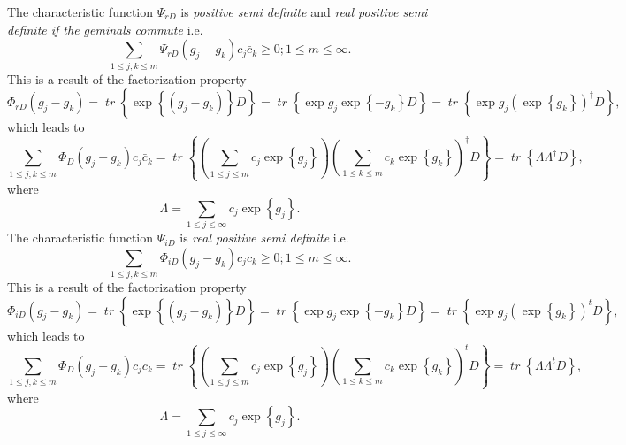 \documentclass[aps,preprint]{revtex4}%
\begin{document}
The characteristic function $\Psi_{rD}$ is \emph{positive semi definite} and
\emph{real positive semi definite if the geminals commute }i.e.
\begin{equation}
\sum_{1\leq j,k\leq m}\Psi_{rD}\left(  g_{j}-g_{k}\right)  c_{j}\bar{c}%
_{k}\geq0;1\leq m\leq\infty.
\end{equation}
This is a result of the factorization property%
\begin{equation}
\Phi_{rD}\left(  g_{j}-g_{k}\right)  =\mathit{\operatorname*{tr}}\left\{
\exp\left\{  \left(  g_{j}-g_{k}\right)  \right\}  D\right\}
=\mathit{\operatorname*{tr}}\left\{  \exp g_{j}\exp\left\{  -g_{k}\right\}
D\right\}  =\mathit{\operatorname*{tr}}\left\{  \exp g_{j}\left(  \exp\left\{
g_{k}\right\}  \right)  ^{\dagger}D\right\}  ,
\end{equation}
which leads to
\begin{equation}
\sum_{1\leq j,k\leq m}\Phi_{D}\left(  g_{j}-g_{k}\right)  c_{j}\bar{c}%
_{k}=\mathit{\operatorname*{tr}}\left\{  \left(  \sum_{1\leq j\leq m}c_{j}%
\exp\left\{  g_{j}\right\}  \right)  \left(  \sum_{1\leq k\leq m}c_{k}%
\exp\left\{  g_{k}\right\}  \right)  ^{\dagger}D\right\}
=\mathit{\operatorname*{tr}}\left\{  \Lambda\Lambda^{\dagger}D\right\}  ,
\end{equation}
where
\begin{equation}
\Lambda=\sum_{1\leq j\leq\infty}c_{j}\exp\left\{  g_{j}\right\}  .
\end{equation}
The characteristic function $\Psi_{iD}$ is \emph{real positive semi definite}
i.e.
\begin{equation}
\sum_{1\leq j,k\leq m}\Phi_{iD}\left(  g_{j}-g_{k}\right)  c_{j}c_{k}%
\geq0;1\leq m\leq\infty.
\end{equation}
This is a result of the factorization property%
\begin{equation}
\Phi_{iD}\left(  g_{j}-g_{k}\right)  =\mathit{\operatorname*{tr}}\left\{
\exp\left\{  \left(  g_{j}-g_{k}\right)  \right\}  D\right\}
=\mathit{\operatorname*{tr}}\left\{  \exp g_{j}\exp\left\{  -g_{k}\right\}
D\right\}  =\mathit{\operatorname*{tr}}\left\{  \exp g_{j}\left(  \exp\left\{
g_{k}\right\}  \right)  ^{t}D\right\}  ,
\end{equation}
which leads to
\begin{equation}
\sum_{1\leq j,k\leq m}\Phi_{D}\left(  g_{j}-g_{k}\right)  c_{j}c_{k}%
=\mathit{\operatorname*{tr}}\left\{  \left(  \sum_{1\leq j\leq m}c_{j}%
\exp\left\{  g_{j}\right\}  \right)  \left(  \sum_{1\leq k\leq m}c_{k}%
\exp\left\{  g_{k}\right\}  \right)  ^{t}D\right\}
=\mathit{\operatorname*{tr}}\left\{  \Lambda\Lambda^{t}D\right\}  ,
\end{equation}
where
\begin{equation}
\Lambda=\sum_{1\leq j\leq\infty}c_{j}\exp\left\{  g_{j}\right\}  .
\end{equation}
\end{document}
